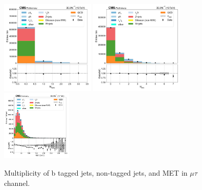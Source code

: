\begin{figure}[htb!]
    \centering
    \includegraphics[width=0.4\textwidth]{chapters/Appendix/sectionPlots/figures/data_mc_overlays/mutau_2016_inclusive_linear_jet_n_bjets}
    \includegraphics[width=0.4\textwidth]{chapters/Appendix/sectionPlots/figures/data_mc_overlays/mutau_2016_inclusive_linear_jet_n_jets}
    \includegraphics[width=0.3\textwidth]{chapters/Appendix/sectionPlots/figures/data_mc_overlays/mutau_2016_inclusive_linear_misc_met_mag}
    \caption{Multiplicity of b tagged jets, non-tagged jets, and MET in
    $\mu\tau$ channel.}
    \label{fig:mutau_jetmet}
\end{figure}


